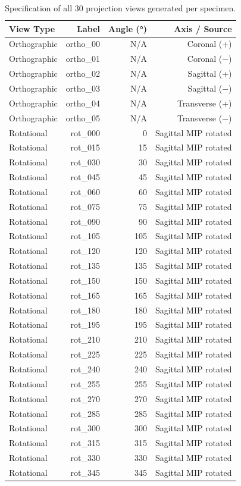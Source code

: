 \begin{table}[htbp]
\caption{Specification of all 30 projection views generated per specimen.}
\label{tab:projection_types}
\begin{tabular}{lrrr}
\toprule
View Type & Label & Angle (°) & Axis / Source \\
\midrule
Orthographic & ortho\_00 & N/A & Coronal (+) \\
Orthographic & ortho\_01 & N/A & Coronal (−) \\
Orthographic & ortho\_02 & N/A & Sagittal (+) \\
Orthographic & ortho\_03 & N/A & Sagittal (−) \\
Orthographic & ortho\_04 & N/A & Transverse (+) \\
Orthographic & ortho\_05 & N/A & Transverse (−) \\
Rotational & rot\_000 & 0 & Sagittal MIP rotated \\
Rotational & rot\_015 & 15 & Sagittal MIP rotated \\
Rotational & rot\_030 & 30 & Sagittal MIP rotated \\
Rotational & rot\_045 & 45 & Sagittal MIP rotated \\
Rotational & rot\_060 & 60 & Sagittal MIP rotated \\
Rotational & rot\_075 & 75 & Sagittal MIP rotated \\
Rotational & rot\_090 & 90 & Sagittal MIP rotated \\
Rotational & rot\_105 & 105 & Sagittal MIP rotated \\
Rotational & rot\_120 & 120 & Sagittal MIP rotated \\
Rotational & rot\_135 & 135 & Sagittal MIP rotated \\
Rotational & rot\_150 & 150 & Sagittal MIP rotated \\
Rotational & rot\_165 & 165 & Sagittal MIP rotated \\
Rotational & rot\_180 & 180 & Sagittal MIP rotated \\
Rotational & rot\_195 & 195 & Sagittal MIP rotated \\
Rotational & rot\_210 & 210 & Sagittal MIP rotated \\
Rotational & rot\_225 & 225 & Sagittal MIP rotated \\
Rotational & rot\_240 & 240 & Sagittal MIP rotated \\
Rotational & rot\_255 & 255 & Sagittal MIP rotated \\
Rotational & rot\_270 & 270 & Sagittal MIP rotated \\
Rotational & rot\_285 & 285 & Sagittal MIP rotated \\
Rotational & rot\_300 & 300 & Sagittal MIP rotated \\
Rotational & rot\_315 & 315 & Sagittal MIP rotated \\
Rotational & rot\_330 & 330 & Sagittal MIP rotated \\
Rotational & rot\_345 & 345 & Sagittal MIP rotated \\
\bottomrule
\end{tabular}
\end{table}
